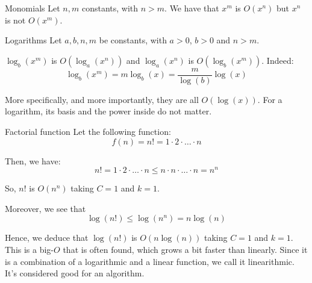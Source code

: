 \documentclass[a4paper]{article}
\begin{document}
\begin{parag}{Monomials}
    Let $n, m$ constants, with $n > m$. We have that $x^{m}$ is $O\left(x^{n}\right)$ but $x^{n}$ is not $O\left(x^{m}\right)$.
\end{parag}

\begin{parag}{Logarithms}
    Let $a, b, n, m$ be constants, with $a > 0$, $b >0$ and $n > m$.

    $\log_b\left(x^{m}\right)$ is $O\left(\log_a\left(x^{n}\right)\right)$ and $\log_a\left(x^{n}\right)$ is $O\left(\log_b\left(x^{m}\right)\right)$. Indeed:
    \[\log_b\left(x^{m}\right) = m \log_b\left(x\right) = \frac{m}{\log\left(b\right)} \log\left(x\right)\]

    More specifically, and more importantly, they are all $O\left(\log\left(x\right)\right)$. For a logarithm, its basis and the power inside do not matter.
\end{parag}

\begin{parag}{Factorial function}
    Let the following function:
    \[f\left(n\right) = n! = 1\cdot 2 \cdot \ldots \cdot n\]

    Then, we have:
    \[n! = 1\cdot 2\cdot\ldots\cdot n \leq n\cdot n\cdot\ldots\cdot n = n^{n}\]

    So, $n!$ is $O\left(n^{n}\right)$ taking $C = 1$ and $k = 1$.

    Moreover, we see that
    \[\log\left(n!\right) \leq \log\left(n^{n}\right) = n\log\left(n\right)\]

    Hence, we deduce that $\log\left(n!\right)$ is $O\left(n\log\left(n\right)\right)$ taking $C = 1$ and $k = 1$. This is a big-$O$ that is often found, which grows a bit faster than linearly. Since it is a combination of a logarithmic and a linear function, we call it linearithmic. It's considered good for an algorithm.
\end{parag}
\end{document}
